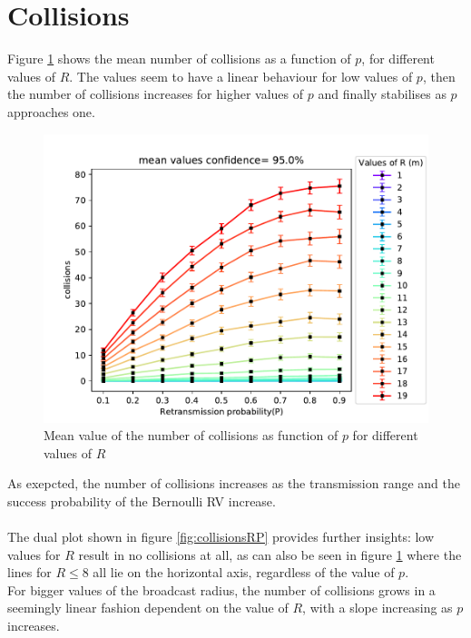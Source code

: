\section{Collisions}
Figure \ref{fig:collisionsPR} shows the mean number of collisions as a function
of $p$, for different values of $R$. The values seem to have a linear behaviour
for low values of $p$, then the number of collisions increases for higher
values of $p$ and finally stabilises as $p$ approaches one.
\begin{figure}[H]
    \begin{center}
        \includegraphics[scale=.7,trim={0 0 0 0.8cm},clip]{img/big_collisions_p_mean_95.0.pdf}
    \end{center}
    \caption{Mean value of the number of collisions as function of $p$ for different values of $R$}
    \label{fig:collisionsPR}
\end{figure}
\noindent
As exepcted, the number of collisions increases as the transmission range and
the success probability of the Bernoulli RV increase.\\
\\
The dual plot shown in figure \ref{fig:collisionsRP} provides further insights:
low values for $R$ result in no collisions at all, as can also be seen in figure
\ref{fig:collisionsPR} where the lines for $R \leq 8$ all lie on the horizontal
axis, regardless of the value of $p$.\\
For bigger values of the broadcast radius, the number of collisions grows in a
seemingly linear fashion dependent on the value of $R$, with a slope increasing
as $p$ increases.\\
